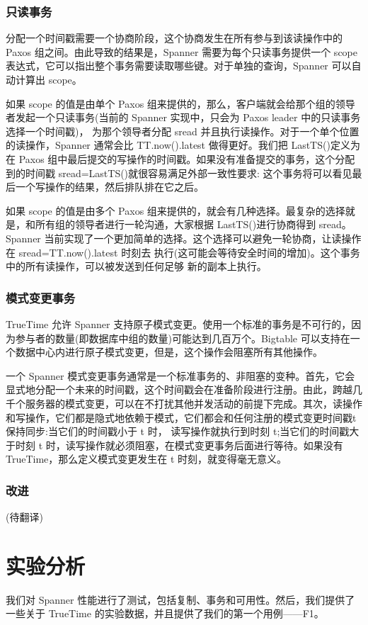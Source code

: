 \documentclass[letterpaper,twocolumn,10pt]{article}
\begin{document}
\subsubsection{只读事务}
分配一个时间戳需要一个协商阶段，这个协商发生在所有参与到该读操作中的 Paxos 组之间。由此导致的结果是，Spanner 需要为每个只读事务提供一个 scope 表达式，它可以指出整个事务需要读取哪些键。对于单独的查询，Spanner 可以自动计算出 scope。

如果 scope 的值是由单个 Paxos 组来提供的，那么，客户端就会给那个组的领导者发起一个只读事务(当前的 Spanner 实现中，只会为 Paxos leader 中的只读事务选择一个时间戳)， 为那个领导者分配 sread 并且执行读操作。对于一个单个位置的读操作，Spanner 通常会比 TT.now().latest 做得更好。我们把 LastTS()定义为在 Paxos 组中最后提交的写操作的时间戳。如果没有准备提交的事务，这个分配到的时间戳 sread=LastTS()就很容易满足外部一致性要求: 这个事务将可以看见最后一个写操作的结果，然后排队排在它之后。

如果 scope 的值是由多个 Paxos 组来提供的，就会有几种选择。最复杂的选择就是，和所有组的领导者进行一轮沟通，大家根据 LastTS()进行协商得到 sread。Spanner 当前实现了一个更加简单的选择。这个选择可以避免一轮协商，让读操作在 sread=TT.now().latest 时刻去 执行(这可能会等待安全时间的增加)。这个事务中的所有读操作，可以被发送到任何足够 新的副本上执行。

\subsubsection{模式变更事务}
TrueTime 允许 Spanner 支持原子模式变更。使用一个标准的事务是不可行的，因为参与者的数量(即数据库中组的数量)可能达到几百万个。Bigtable 可以支持在一个数据中心内进行原子模式变更，但是，这个操作会阻塞所有其他操作。

一个 Spanner 模式变更事务通常是一个标准事务的、非阻塞的变种。首先，它会显式地分配一个未来的时间戳，这个时间戳会在准备阶段进行注册。由此，跨越几千个服务器的模式变更，可以在不打扰其他并发活动的前提下完成。其次，读操作和写操作，它们都是隐式地依赖于模式，它们都会和任何注册的模式变更时间戳t保持同步:当它们的时间戳小于 t 时， 读写操作就执行到时刻 t;当它们的时间戳大于时刻 t 时，读写操作就必须阻塞，在模式变更事务后面进行等待。如果没有 TrueTime，那么定义模式变更发生在 t 时刻，就变得毫无意义。

\subsubsection{改进}
(待翻译)

\section{实验分析}
我们对 Spanner 性能进行了测试，包括复制、事务和可用性。然后，我们提供了一些关于 TrueTime 的实验数据，并且提供了我们的第一个用例——F1。
\end{document}
